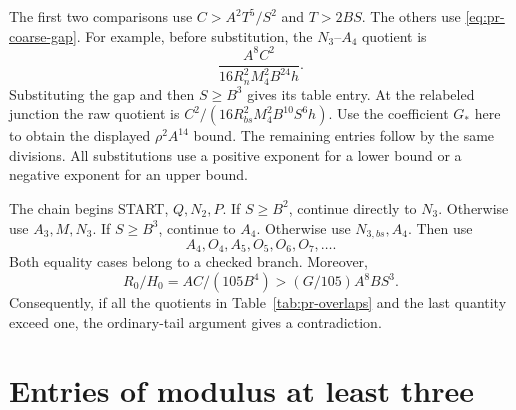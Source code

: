 \documentclass[12pt]{article}
\numberwithin{equation}{section}
\begin{document}
The first two comparisons use $C>A^2T^5/S^2$ and $T>2BS$.
The others use \eqref{eq:pr-coarse-gap}.
For example, before substitution, the $N_3$--$A_4$ quotient is
\[
 \frac{A^8C^2}{16R_n^2M_4^2B^{24}h}.
\]
Substituting the gap and then $S\ge B^3$ gives its table entry.
At the relabeled junction the raw quotient is
$C^2/(16R_{bs}^2M_4^2B^{10}S^6h)$.
Use the coefficient $G_*$ here to obtain the displayed
$\rho^2A^{14}$ bound.
The remaining entries follow by the same divisions. All substitutions
use a positive exponent for a lower bound or a negative exponent for an
upper bound.

The chain begins START, $Q,N_2,P$. If $S\ge B^2$, continue directly
to $N_3$. Otherwise use $A_3,M,N_3$. If $S\ge B^3$, continue
to $A_4$. Otherwise use $N_{3,bs},A_4$. Then use
\[
 A_4,O_4,A_5,O_5,O_6,O_7,\ldots .
\]
Both equality cases belong to a checked branch. Moreover,
\[
 R_0/H_0=AC/(105B^4)>(G/105)A^8BS^3.
\]
Consequently, if all the quotients in Table~\ref{tab:pr-overlaps}
and the last quantity exceed one, the ordinary-tail argument gives
a contradiction.

\section{Entries of modulus at least three}
\label{sec:all-large}
\end{document}
